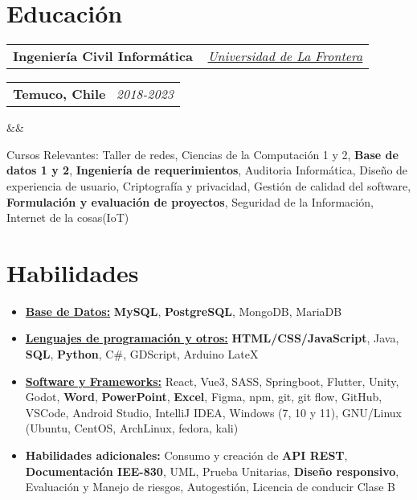 \documentclass[11pt,a4paper,sans]{moderncv}
\makeatletter
\newcommand{\sectionMargin}{-3mm}
\newcommand*{\customcventry}[7][.13em]{
    \begin{tabular}{@{}l}
    {\bfseries #4} \
    {\itshape #3}
    \end{tabular}
    \hfill
    \begin{tabular}{l@{}}
    {\bfseries #5} \
    {\itshape #2}
    \end{tabular}
    \ifx&#7&%
    \else{\
    \begin{minipage}{\maincolumnwidth}%
    \small#7%
    \end{minipage}}\fi%
    \par\addvspace{#1}
}
\makeatother
\begin{document}
\section{Educación}{
    \customcventry
        {2018-2023}
        { \href{https://1drv.ms/b/c/13c8ae619d64655e/EV5lZJ1hrsgggBOHLAAAAAABHh9OZUbWLd2nx7PTa_OSsg?e=Fedmge}
        {\underline{Universidad de La Frontera}} }
        {Ingeniería Civil Informática}
        {Temuco, Chile}{}{}
        {Cursos Relevantes: 
            {Taller de redes}, 
            {Ciencias de la Computación} 1 y 2, 
            \textbf{Base de datos 1 y 2}, 
            \textbf{Ingeniería de requerimientos},
            {Auditoria Informática}, 
            {Diseño de experiencia de usuario}, 
            {Criptografía y privacidad}, 
            Gestión de {calidad del software}, 
            \textbf{Formulación y evaluación de proyectos},
            {Seguridad de la Información},
            Internet de la cosas{(IoT)}
    }
}

\vspace*{\sectionMargin}
\section{Habilidades}{
    \begin{itemize}[label=\textbullet]
        \item {\underline{\textbf{Base de Datos:}}
            \textbf{MySQL},
            \textbf{PostgreSQL},
            {MongoDB},
            {MariaDB}
        }
        \item {\underline{\textbf{Lenguajes de programación y otros:}}
            \textbf{HTML/CSS/JavaScript},
            {Java},
            \textbf{SQL},
            \textbf{Python},
            {C\#},
            {GDScript},
            {Arduino}
            {LateX}
        }
        \item {\underline{\textbf{Software y Frameworks:}}
            {React},
            {Vue3},
            {SASS},
            {Springboot},
            {Flutter},
            {Unity},
            {Godot},
            \textbf{Word},
            \textbf{PowerPoint},
            \textbf{Excel}, 
            {Figma},
            {npm},
            {git},
            {git flow},
            {GitHub},
            {VSCode},
            {Android Studio},
            {IntelliJ IDEA},
            {Windows} (7, 10 y 11),
            {GNU/Linux} (Ubuntu, CentOS, ArchLinux, fedora, kali)
        }
        \item {\textbf{Habilidades adicionales:} 
            Consumo y creación de \textbf{API REST},
            \textbf{Documentación IEE-830},
            {UML},
            {Prueba Unitarias},
            \textbf{Diseño responsivo},
            Evaluación y {Manejo de riesgos},  
            Autogestión, 
            Licencia de conducir Clase B
        }
    \end{itemize}
}
\end{document}
